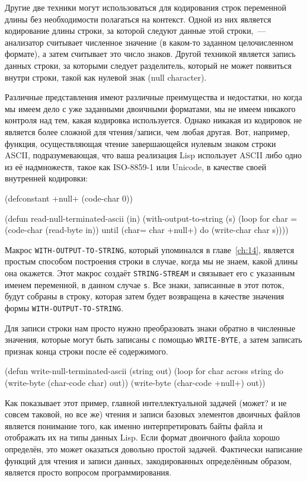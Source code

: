 Другие две техники могут использоваться для кодирования строк переменной длины без
необходимости полагаться на контекст. Одной из них является кодирование длины строки, за
которой следуют данные этой строки,~--- анализатор считывает численное значение (в каком-то
заданном целочисленном формате), а затем считывает это число знаков. Другой техникой
является запись данных строки, за которыми следует разделитель, который не может появиться
внутри строки, такой как нулевой знак (null character).

Различные представления имеют различные преимущества и недостатки, но когда мы имеем дело
с уже заданными двоичными форматами, мы не имеем никакого контроля над тем, какая
кодировка используется. Однако никакая из кодировок не является более сложной для
чтения/записи, чем любая другая. Вот, например, функция, осуществляющая чтение
завершающейся нулевым знаком строки ASCII, под\-ра\-зуме\-ваю\-щая, что ваша реализация Lisp
использует ASCII либо одно из её надмножеств, такое как ISO-8859-1 или Unicode, в качестве
своей внутренней кодировки:

\begin{myverb}
(defconstant +null+ (code-char 0))

(defun read-null-terminated-ascii (in)
  (with-output-to-string (s)
    (loop for char = (code-char (read-byte in))
          until (char= char +null+) do (write-char char s))))
\end{myverb}

Макрос \lstinline{WITH-OUTPUT-TO-STRING}, который упоминался в главе~\ref{ch:14}, является
простым способом построения строки в случае, когда мы не знаем, какой длины она
окажется. Этот макрос создаёт \lstinline{STRING-STREAM} и связывает его с указанным именем
переменной, в данном случае \lstinline{s}. Все знаки, записанные в этот поток, будут собраны в
строку, которая затем будет возвращена в качестве значения формы
\lstinline{WITH-OUTPUT-TO-STRING}.

Для записи строки нам просто нужно преобразовать знаки обратно в численные значения,
которые могут быть записаны с помощью \lstinline{WRITE-BYTE}, а затем записать признак конца
строки после её содержимого.

\begin{myverb}
(defun write-null-terminated-ascii (string out)
  (loop for char across string
        do (write-byte (char-code char) out))
  (write-byte (char-code +null+) out))
\end{myverb}

Как показывает этот пример, главной интеллектуальной задачей (может? и не совсем таковой,
но все же) чтения и записи базовых элементов двоичных файлов является понимание того, как
именно интерпретировать байты файла и отображать их на типы данных Lisp. Если формат
двоичного файла хорошо определён, это может оказаться довольно простой задачей. Фактически
написание функций для чтения и записи данных, закодированных определённым образом,
является просто вопросом программирования.

